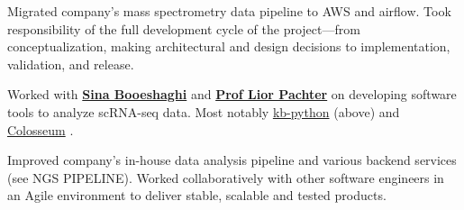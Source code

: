 \documentclass[]{resume}
\begin{document}
\begin{minipage}[t]{0.69\textwidth}
Migrated company's mass spectrometry data pipeline to AWS and airflow. Took responsibility of the full development cycle of the project---from conceptualization, making architectural and design decisions to implementation, validation, and release.
\sectionsep

Worked with \textbf{\href{https://sinabooeshaghi.com/}{Sina Booeshaghi}} and \textbf{\href{https://pachterlab.github.io/biography.html}{Prof Lior Pachter}} on developing software tools to analyze scRNA-seq data. Most notably \href{https://github.com/pachterlab/kb_python}{kb-python} \cite{kb} (above) and \href{https://github.com/pachterlab/colosseum}{Colosseum} \cite{colosseum}.
\sectionsep

Improved company's in-house data analysis pipeline and various backend services (see NGS PIPELINE). Worked collaboratively with other software engineers in an Agile environment to deliver stable, scalable and tested products.
\sectionsep






\end{minipage}
\end{document}
